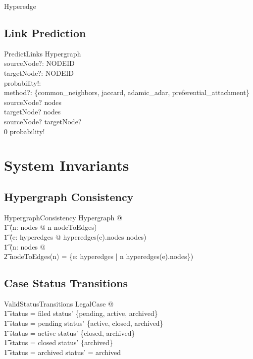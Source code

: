 \documentclass{article}
\begin{document}
\begin{class}{Hyperedge}
\subsection{Link Prediction}

\begin{schema}{PredictLinks}
    \Xi Hypergraph \\
    sourceNode?: NODEID \\
    targetNode?: NODEID \\
    probability!: \real \\
    method?: \{common\_neighbors, jaccard, adamic\_adar, preferential\_attachment\}
\where
    sourceNode? \in \dom nodes \\
    targetNode? \in \dom nodes \\
    sourceNode? \neq targetNode? \\
    0 \leq probability! 
\end{schema}

\newpage

\section{System Invariants}

\subsection{Hypergraph Consistency}

\begin{theorem}{HypergraphConsistency}
\forall Hypergraph @ \\
\t1 (\forall n: \dom nodes @ n \in \dom nodeToEdges) \land \\
\t1 (\forall e: \dom hyperedges @ hyperedges(e).nodes \subseteq \dom nodes) \land \\
\t1 (\forall n: \dom nodes @ \\
\t2 nodeToEdges(n) = \{e: \dom hyperedges | n \in hyperedges(e).nodes\})
\end{theorem}

\subsection{Case Status Transitions}

\begin{theorem}{ValidStatusTransitions}
\forall LegalCase @ \\
\t1 status = filed \implies status' \in \{pending, active, archived\} \land \\
\t1 status = pending \implies status' \in \{active, closed, archived\} \land \\
\t1 status = active \implies status' \in \{closed, archived\} \land \\
\t1 status = closed \implies status' \in \{archived\} \land \\
\t1 status = archived \implies status' = archived
\end{theorem}


\end{class}
\end{document}
